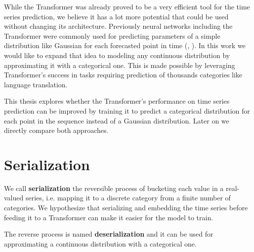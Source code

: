\documentclass[en]{pracamgr}
\begin{document}
While the Transformer was already proved to be a very efficient tool for the time series prediction, we believe it has a lot more potential that could be used without changing its architecture.
Previously neural networks including the Transformer were commonly used for predicting parameters of a simple distribution like Gaussian for each forecasted point in time (\cite{deepar}, \cite{enhancing}). In this work we would like to expand that idea to modeling any continuous distribution by approximating it with a categorical one.
This is made possible by leveraging Transformer's success in tasks requiring prediction of thousands categories like language translation. 

This thesis explores whether the Transformer's performance on time series prediction can be improved by training it to predict a categorical distribution for each point in the sequence instead of a Gaussian distribution. Later on we directly compare both approaches.

\section{Serialization}

We call \textbf{serialization} the reversible process of bucketing each value in a real-valued series, i.e. mapping it to a discrete category from a finite number of categories.
We hypothesize that serializing and embedding the time series before feeding it to a Transformer can make it easier for the model to train.

The reverse process is named \textbf{deserialization} and it can be used for approximating a continuous distribution with a categorical one.
\end{document}
